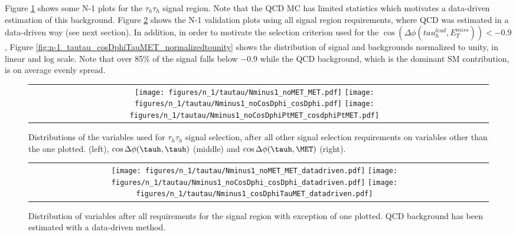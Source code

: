 
Figure \ref{fig:n-1_tautau_QCDMC} shows some N-1 plots for the $\tau_{h}\tau_{h}$ signal region. Note that the QCD MC has limited statistics which motivates
a data-driven estimation of this background. Figure \ref{fig:n-1_tautau_QCDdatadriven} shows the N-1 validation plots using all signal region requirements, where 
QCD was estimated in a data-driven way (see next section). In addition, in order
to motivate the selection criterion used for the  $\cos(\Delta\phi(tau_{h}^{lead}, E^{miss}_{T})) < -0.9 $, Figure \ref{fig:n-1_tautau_cosDphiTauMET_normalizedtounity}
shows the distribution of signal and backgrounds normalized to unity, in linear and log scale. Note that over 85$\%$ of the signal falls below $-0.9$ while the QCD
background, which is the dominant SM contribution, is on average evenly spread.


\begin{figure}[tbhp!]
      \centering
      \begin{tabular}{cc}
        \texttt{[image: figures/n\_1/tautau/Nminus1\_noMET\_MET.pdf]} 
        \texttt{[image: figures/n\_1/tautau/Nminus1\_noCosDphi\_cosDphi.pdf]} 
        \texttt{[image: figures/n\_1/tautau/Nminus1\_noCosDphiPtMET\_cosdphiPtMET.pdf]}
      \end{tabular}
      \caption{Distributions of the variables used for $\tau_{h}\tau_{h}$ signal selection, after all other signal 
        selection requirements on variables other than the one plotted. \ETslash (left), $\cos{\Delta \phi (\tauh,\tauh)}$ (middle) and $\cos{\Delta \phi (\tauh,\MET)}$ (right).}
    \label{fig:n-1_tautau_QCDMC}
\end{figure}

\begin{figure}[tbhp!]
      \centering
      \begin{tabular}{cc}                                                               
        \texttt{[image: figures/n\_1/tautau/Nminus1\_noMET\_MET\_datadriven.pdf]} 
        \texttt{[image: figures/n\_1/tautau/Nminus1\_noCosDphi\_cosDphi\_datadriven.pdf]} 
        \texttt{[image: figures/n\_1/tautau/Nminus1\_cosDphiTauMET\_datadriven.pdf]}
      \end{tabular}
      \caption{Distribution of variables after all requirements for the signal region with exception of one plotted. QCD background has been estimated with a data-driven method.}
    \label{fig:n-1_tautau_QCDdatadriven}
 \end{figure}

